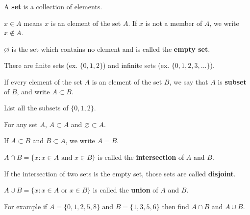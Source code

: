 \documentclass[../main.tex]{subfiles}
\begin{document}
A \textbf{set} is a collection of elements.

$x\in A$ means $x$ is an element of the set $A$.
If $x$ is not a member of $A$, we write $x\notin A$.

$\varnothing$ is the set which contains no element and is called the \textbf{empty set}.

There are finite sets (ex. $\{0,1,2\}$) and infinite sets (ex. $\{0,1,2,3,...\}$).

If every element of the set $A$ is an element of the set $B$, we say that $A$ is \textbf{subset} of $B$, and write $A\subset B$.

\begin{example}
  List all the subsets of $\{0,1,2\}$.
\end{example}

For any set $A$, $A\subset A$ and $\varnothing \subset A$.

If $A\subset B$ and $B\subset A$, we write $A=B$.

$A\cap B = \{x:x\in A \text{ and } x\in B\}$ is called the \textbf{intersection} of $A$ and $B$.
\begin{center}
\end{center}

If the intersection of two sets is the empty set, those sets are called \textbf{disjoint}.

$A\cup B=\{x:x\in A \text{ or } x\in B\}$ is called the \textbf{union} of $A$ and $B$.
\begin{center}
\end{center}

\begin{example}
For example if $A=\{0,1,2,5,8\}$ and $B=\{1,3,5,6\}$ then find $A\cap B$ and $A\cup B$.
\end{example}
\end{document}
